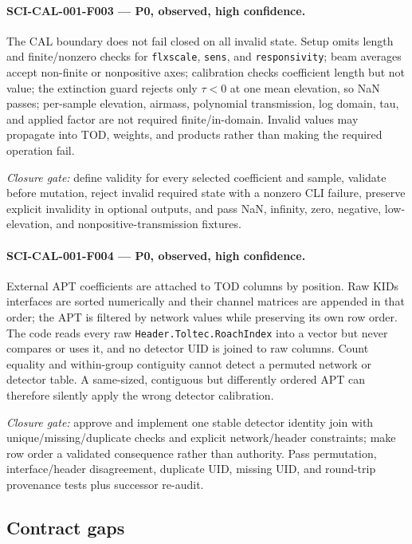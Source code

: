 \documentclass[11pt]{article}
\newcommand{\code}[1]{\nolinkurl{#1}}
\begin{document}
\paragraph{SCI-CAL-001-F003 --- P0, observed, high confidence.}
The CAL boundary does not fail closed on all invalid state.  Setup omits length
and finite/nonzero checks for \code{flxscale}, \code{sens}, and
\code{responsivity}; beam averages accept non-finite or nonpositive axes;
calibration checks coefficient length but not value; the extinction guard
rejects only \(\tau<0\) at one mean elevation, so NaN passes; per-sample
elevation, airmass, polynomial transmission, log domain, tau, and applied
factor are not required finite/in-domain.  Invalid values may propagate into
TOD, weights, and products rather than making the required operation fail.

\emph{Closure gate:} define validity for every selected coefficient and sample,
validate before mutation, reject invalid required state with a nonzero CLI
failure, preserve explicit invalidity in optional outputs, and pass NaN,
infinity, zero, negative, low-elevation, and nonpositive-transmission fixtures.

\paragraph{SCI-CAL-001-F004 --- P0, observed, high confidence.}
External APT coefficients are attached to TOD columns by position.  Raw KIDs
interfaces are sorted numerically and their channel matrices are appended in
that order; the APT is filtered by network values while preserving its own row
order.  The code reads every raw \code{Header.Toltec.RoachIndex} into a vector
but never compares or uses it, and no detector UID is joined to raw columns.
Count equality and within-group contiguity cannot detect a permuted network or
detector table.  A same-sized, contiguous but differently ordered APT can
therefore silently apply the wrong detector calibration.

\emph{Closure gate:} approve and implement one stable detector identity join
with unique/missing/duplicate checks and explicit network/header constraints;
make row order a validated consequence rather than authority.  Pass
permutation, interface/header disagreement, duplicate UID, missing UID, and
round-trip provenance tests plus successor re-audit.

\subsection{Contract gaps}
\end{document}
